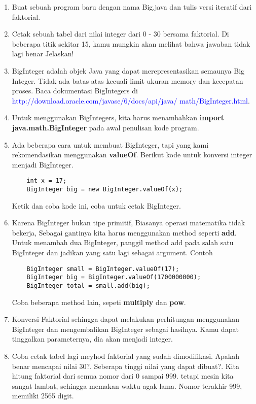\begin{enumerate}
\item Buat sebuah program baru dengan nama Big.java dan tulis versi iteratif dari faktorial.
\item Cetak sebuah tabel dari nilai integer dari 0 - 30 bersama faktorial. Di beberapa titik sekitar 15, kamu mungkin akan melihat bahwa jawaban tidak lagi benar Jelaskan!
\item BigInteger adalah objek Java yang dapat merepresentasikan semaunya Big Integer. Tidak ada batas atas kecuali limit ukuran memory dan kecepatan proses. Baca dokumentasi BigIntegers di \textcolor{blue}{http://download.oracle.com/javase/6/docs/api/java/ math/BigInteger.html}.
\item Untuk menggunakan BigIntegers, kita harus menambahkan \textbf{import java.math.BigInteger} pada awal penulisan kode program.
\item Ada beberapa cara untuk membuat BigInteger, tapi yang kami rekomendasikan menggunakan \textbf{valueOf}. Berikut kode untuk konversi integer menjadi BigInteger.
\begin{lstlisting}
	int x = 17;
	BigInteger big = new BigInteger.valueOf(x);
\end{lstlisting}
Ketik dan coba kode ini, coba untuk cetak BigInteger.
\item Karena BigInteger bukan tipe primitif, Biasanya operasi matematika tidak bekerja, Sebagai gantinya kita harus menggunakan method seperti \textbf{add}. Untuk menambah dua BigInteger, panggil method add pada salah satu BigInteger dan jadikan yang satu lagi sebagai argument. Contoh
\begin{lstlisting}
	BigInteger small = BigInteger.valueOf(17);
	BigInteger big = BigInteger.valueOf(1700000000);
	BigInteger total = small.add(big);
\end{lstlisting}
Coba beberapa method lain, sepeti \textbf{multiply} dan \textbf{pow}.
\item Konversi Faktorial sehingga dapat melakukan perhitungan menggunakan BigInteger dan mengembalikan BigInteger sebagai hasilnya. Kamu dapat tinggalkan parameternya, dia akan menjadi integer.
\item Coba cetak tabel lagi meyhod faktorial yang sudah dimodifikasi. Apakah benar mencapai nilai 30?. Seberapa tinggi nilai yang dapat dibuat?. Kita hitung faktorial dari semua nomor dari 0 sampai 999. tetapi mesin kita sangat lambat, sehingga memakan waktu agak lama.  Nomor terakhir 999, memiliki 2565 digit.
\end{enumerate}

